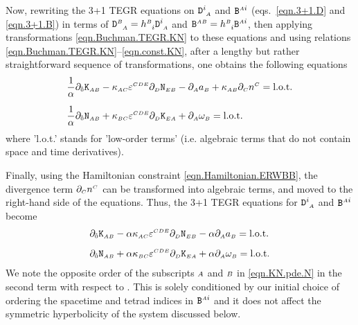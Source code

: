 \documentclass[
10pt, %
a4paper, %
oneside, %
twocolumn,
headinclude,footinclude, %
BCOR5mm, %
]{scrartcl}
\newcommand{\sA}{\mathsmaller A}
\newcommand{\sB}{\mathsmaller B}
\newcommand{\sC}{\mathsmaller C}
\newcommand{\sD}{\mathsmaller D}
\newcommand{\sE}{\mathsmaller E}
\newcommand{\pd}[1]{\partial_{#1}}
\newcommand{\mg}[1]{\kappa_{#1}}			%
\newcommand{\tetrsymbol}{h}
\newcommand{\tetr}[2]{\tetrsymbol^{#1}_{\phantom{#1}#2}}
\newcommand{\Dfin}[2]{\mathtt{D}_{\phantom{#2}#1}^{#2}}	%
\newcommand{\Kbuch}[2]{\mathtt{K}_{{#1}{#2}}}	%
\newcommand{\Nbuchdown}[2]{\mathtt{N}_{#1#2}}	%
\newcommand{\Bfin}[2]{\mathtt{B}^{#1#2}}	%
\newcommand{\LCtens}{\varepsilon} %
\newcommand{\indalg}[1]{\hat{\mathsmaller{#1}}}
\newcommand{\lapse}{\alpha}
\begin{document}
	Now, rewriting the 3+1 TEGR equations on $\Dfin{\sA}{i}$ and $\Bfin{\sA}{i}$
	(eqs.~\eqref{eqn.3+1.D} and \eqref{eqn.3+1.B}) in terms of $\Dfin{\sA}{\sB}
	= \tetr{\sB}{i}\Dfin{\sA}{i}$ and $\Bfin{\sA}{\sB} =
	\tetr{\sB}{i}\Bfin{\sA}{i}$, then applying transformations
	\eqref{eqn.Buchman.TEGR.KN} to these equations and using relations
	\eqref{eqn.Buchman.TEGR.KN}--\eqref{eqn.const.KN}, after a lengthy but
	rather straightforward sequence of transformations, one obtains the following equations
		\begin{subequations}\label{eqn.KN.pde0}
		\begin{align}
			\frac{1}{\lapse}\pd{\indalg{0}} \Kbuch{\sA}{\sB}
			&
			- \mg{\sA\sC}\LCtens^{\sC\sD\sE} \pd{\sD} \Nbuchdown{\sE}{\sB}
			- \pd{\sA} a_{\sB}  + \mg{\sA\sB} \pd{\sC} n^\sC = \text{l.o.t.}
			\\[2mm]
			\frac{1}{\lapse}\pd{\indalg{0}} \Nbuchdown{\sA}{\sB}
			&
			+ \mg{\sB\sC}\LCtens^{\sC\sD\sE} \pd{\sD} \Kbuch{\sE}{\sA}
			+ \pd{\sA} \omega_{\sB} = \text{l.o.t.}
			\label{eqn.KN.pde.N}
		\end{align}
	\end{subequations}
	where 'l.o.t.' stands for 'low-order terms' (i.e. algebraic terms that do
	not contain space and time derivatives).

	Finally, using the Hamiltonian constraint \eqref{eqn.Hamiltonian.ERWBB}, the
	divergence term $\pd{\sC}n^\sC$ can be transformed into algebraic terms, and
	moved to the right-hand side of the equations. Thus, the 3+1 TEGR equations
	for $\Dfin{\sA}{i}$ and $\Bfin{\sA}{i}$ become
	\begin{subequations}\label{eqn.KN.pde}
		\begin{align}
			\pd{\indalg{0}} \Kbuch{\sA}{\sB}
			&
			- \alpha \mg{\sA\sC}\LCtens^{\sC\sD\sE} \pd{\sD} \Nbuchdown{\sE}{\sB}
			- \alpha \pd{\sA} a_{\sB} = \text{l.o.t.}\label{eqn.KN.pde.K}
			\\[2mm]
			\pd{\indalg{0}} \Nbuchdown{\sA}{\sB}
			&
			+ \alpha \mg{\sB\sC}\LCtens^{\sC\sD\sE} \pd{\sD} \Kbuch{\sE}{\sA}
			+ \alpha \pd{\sA} \omega_{\sB} = \text{l.o.t.}
			\label{eqn.KN.pde.N}
		\end{align}
	\end{subequations}
	We note the opposite order of the subscripts $\sA$ and $\sB$ in
	\eqref{eqn.KN.pde.N} in the second term with respect to
	\cite[eq.(40)]{Buchman2003}. This is solely conditioned by our initial
	choice of ordering the spacetime and tetrad indices in $\Bfin{\sA}{i}$ and
	it does not affect the symmetric hyperbolicity of the system discussed
	below.
\end{document}
